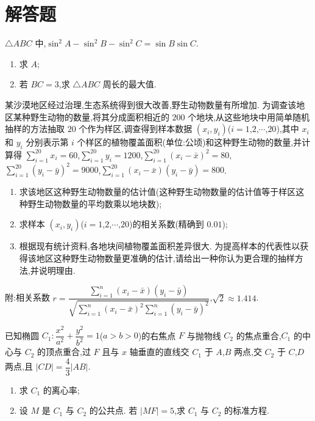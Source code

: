 \section{解答题}

\begin{problem}
\(\triangle ABC\) 中,\(\sin^2 A-\sin^2 B-\sin^2 C=\sin B\sin C\).

\begin{enumerate}
\item 求 \(A\);
\item 若 \(BC=3\),求 \(\triangle ABC\) 周长的最大值.
\end{enumerate}
\end{problem}

\begin{problem}
某沙漠地区经过治理,生态系统得到很大改善,野生动物数量有所增加. 为调查该地区某种野生动物的数量,将其分成面积相近的 \(200\) 个地块,从这些地块中用简单随机抽样的方法抽取 \(20\) 个作为样区,调查得到样本数据 \((x_i,y_i)\)(\(i=1\),\(2\),\(\cdots\),\(20\)),其中 \(x_i\) 和 \(y_i\) 分别表示第 \(i\) 个样区的植物覆盖面积(单位:公顷)和这种野生动物的数量,并计算得 \(\sum_{i=1}^{20}x_i=60\),\(\sum_{i=1}^{20}y_i=1200\),\(\sum_{i=1}^{20}\left( x_i-\bar{x} \right)^2=80\),\(\sum_{i=1}^{20}\left( y_i-\bar{y} \right)^2=9000\),\(\sum_{i=1}^{20}\left( x_i-\bar{x} \right)\left( y_i-\bar{y} \right)=800\).

\begin{enumerate}
\item 求该地区这种野生动物数量的估计值(这种野生动物数量的估计值等于样区这种野生动物数量的平均数乘以地块数);
\item 求样本 \((x_i,y_i)\)(\(i=1\),\(2\),\(\cdots\),\(20\))的相关系数(精确到 \(0.01\));
\item 根据现有统计资料,各地块间植物覆盖面积差异很大. 为提高样本的代表性以获得该地区这种野生动物数量更准确的估计,请给出一种你认为更合理的抽样方法,并说明理由.
\end{enumerate}

附:相关系数 \(r=\dfrac{\sum_{i=1}^{n}\left( x_i-\bar{x} \right)\left( y_i-\bar{y} \right)}{\sqrt{\sum_{i=1}^{n}\left( x_i-\bar{x} \right)^2\sum_{i=1}^{n}\left( y_i-\bar{y} \right)^2}}\),\(\sqrt2\approx 1.414\).
\end{problem}

\begin{problem}
已知椭圆 \(C_1:\dfrac{x^2}{a^2}+\dfrac{y^2}{b^2}=1\)(\(a>b>0\))的右焦点 \(F\) 与抛物线 \(C_2\) 的焦点重合,\(C_1\) 的中心与 \(C_2\) 的顶点重合,过 \(F\) 且与 \(x\) 轴垂直的直线交 \(C_1\) 于 \(A\),\(B\) 两点,交 \(C_2\) 于 \(C\),\(D\) 两点,且 \(|CD|=\dfrac{4}{3}|AB|\).

\begin{enumerate}
\item 求 \(C_1\) 的离心率;
\item 设 \(M\) 是 \(C_1\) 与 \(C_2\) 的公共点. 若 \(|MF|=5\),求 \(C_1\) 与 \(C_2\) 的标准方程.
\end{enumerate}
\end{problem}

